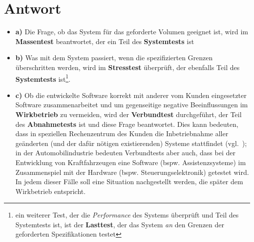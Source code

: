 
\section*{Antwort}

\begin{itemize}
    \item \textbf{a)} Die Frage, ob das System für das geforderte Volumen geeignet ist, wird im \textbf{Massentest} beantwortet, der ein Teil des \textbf{Systemtests} ist
    \item \textbf{b)} Was mit dem System passiert, wenn die spezifizierten Grenzen überschritten werden, wird im \textbf{Stresstest} überprüft, der ebenfalls Teil des \textbf{Systemtests} ist\footnote{
    ein weiterer Test, der die \textit{Performance} des Systems überprüft und Teil des Systemtests ist, ist der \textbf{Lasttest}, der das System \textit{an} den Grenzen der geforderten Spezifikationen testet
    }.
    \item \textbf{c)} Ob die entwickelte Software korrekt mit anderer vom Kunden eingesetzter Software zusammenarbeitet und um gegenseitige negative Beeinflussungen im \textbf{Wirkbetrieb} zu vermeiden, wird der \textbf{Verbundtest} durchgeführt, der Teil des \textbf{Abnahmetests} ist und diese Frage beantwortet.
    Dies kann bedeuten, dass in speziellen Rechenzentrum des Kunden die Inbetriebnahme aller geänderten (und der dafür nötigen existierenden) Systeme stattfindet (vgl.~\cite[65]{Wed09c}); in der Automobilindustrie bedeuten Verbundtests aber auch, dass bei der Entwicklung von Kraftfahrzeugen eine Software (bspw. Assistenzsysteme) im Zusammenspiel mit der Hardware (bspw. Steuerungselektronik) getestet wird.
    In jedem dieser Fälle  soll eine Situation nachgestellt werden, die später dem Wirkbetrieb entspricht.
\end{itemize}